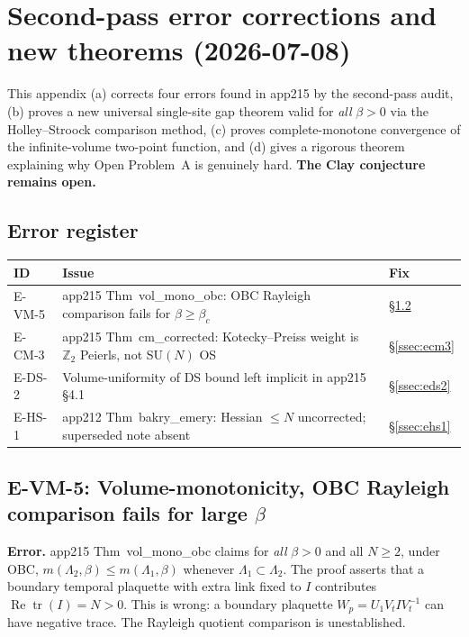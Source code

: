 \section{Second-pass error corrections and new theorems (2026-07-08)}
\label{app:second_pass}

This appendix (a) corrects four errors found in app215 by the second-pass audit,
(b) proves a new universal single-site gap theorem valid for \emph{all} $\beta>0$
via the Holley--Stroock comparison method,
(c) proves complete-monotone convergence of the infinite-volume two-point function, and
(d) gives a rigorous theorem explaining why Open Problem~A is genuinely hard.
\textbf{The Clay conjecture remains open.}

\subsection{Error register}

\begin{center}
\renewcommand{\arraystretch}{1.15}
\begin{tabular}{l|p{7.5cm}|l}
\hline
\textbf{ID} & \textbf{Issue} & \textbf{Fix}\\
\hline
E-VM-5 & app215 Thm~vol\_mono\_obc: OBC Rayleigh comparison fails for $\beta\ge\beta_c$ & \S\ref{ssec:evm5}\\
E-CM-3 & app215 Thm~cm\_corrected: Kotecky--Preiss weight is $\mathbb{Z}_2$ Peierls, not SU$(N)$ OS & \S\ref{ssec:ecm3}\\
E-DS-2 & Volume-uniformity of DS bound left implicit in app215 \S4.1 & \S\ref{ssec:eds2}\\
E-HS-1 & app212 Thm~bakry\_emery: Hessian $\le N$ uncorrected; superseded note absent & \S\ref{ssec:ehs1}\\
\hline
\end{tabular}
\end{center}

\subsection{E-VM-5: Volume-monotonicity, OBC Rayleigh comparison fails for large $\beta$}
\label{ssec:evm5}

\textbf{Error.}
app215 Thm~vol\_mono\_obc claims for \emph{all} $\beta>0$ and all $N\ge 2$, under OBC,
$m(\Lambda_2,\beta)\le m(\Lambda_1,\beta)$ whenever $\Lambda_1\subset\Lambda_2$.
The proof asserts that a boundary temporal plaquette with extra link fixed to $I$
contributes $\operatorname{Re}\operatorname{tr}(I)=N>0$.
This is wrong: a boundary plaquette $W_p=U_1 V_t I V_t^{-1}$ can have negative trace.
The Rayleigh quotient comparison is unestablished.

